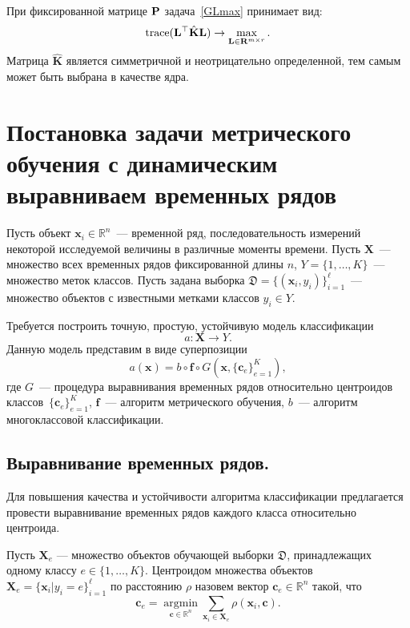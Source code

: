 При фиксированной матрице $\mathbf{P}$ задача~\eqref{GLmax} принимает вид:
\begin{equation*}
\text{trace} (\mathbf{L}^{\top} \hat{\mathbf{K}} \mathbf{L}) \to \max_{\mathbf{L} \in \mathbf{R}^{m \times r}}.
\end{equation*}
Матрица $\hat{\mathbf{K}}$ является симметричной и неотрицательно определенной, тем самым может быть выбрана в качестве ядра.

\section{Постановка задачи метрического обучения с динамическим выравниваем временных рядов}
Пусть объект $\mathbf{x}_i \in \mathbb{R}^n$~--- временной ряд, последовательность измерений некоторой исследуемой величины в различные моменты времени.
Пусть $\mathbf{X}$~--- множество всех временных рядов фиксированной длины $n$, $Y = \{1, \dots, K\}$~--- множество меток классов.
Пусть задана выборка $\mathfrak{D} = \{(\mathbf{x}_i, y_i)\}_{i=1}^\ell$~--- множество объектов с известными метками классов $y_i \in Y$.

Требуется построить точную, простую, устойчивую модель классификации
\[
a: \mathbf{X} \to Y.
\]
Данную модель представим в виде суперпозиции
\begin{equation}
\label{ch4:eq:classifiers}
a(\mathbf{x}) = b \circ \mathbf{f} \circ G(\mathbf{x}, \{\mathbf{c}_e\}_{e = 1} ^ K),
\end{equation}
где $G$~--- процедура выравнивания временных рядов относительно центроидов классов~$\{\mathbf{c}_e\}_{e = 1} ^ K$, $\mathbf{f}$~--- алгоритм метрического обучения, $b$~--- алгоритм многоклассовой классификации.

\subsection{Выравнивание временных рядов.}

Для повышения качества и устойчивости алгоритма классификации предлагается провести выравнивание временных рядов каждого класса относительно центроида.

Пусть $\mathbf{X}_e$ --- множество объектов обучающей выборки $\mathfrak{D}$, принадлежащих одному классу $e \in \{1, \dots, K\}$.
Центроидом множества объектов $\mathbf{X}_e = \{\mathbf{x}_i|y_i=e\}_{i=1}^\ell$ по расстоянию $\rho$ назовем вектор $\mathbf{c}_e \in \mathbb{R}^n$ такой, что
\begin{equation}
\label{centroid_task}
\mathbf{c}_e = \mathop{\text{argmin}}\limits_{{\mathbf{c} \in \mathbb{R}^n}}\sum_{\mathbf{x}_i \in \mathbf{X}_e}
{\rho(\mathbf{x}_i ,\mathbf{c})}.
\end{equation}

